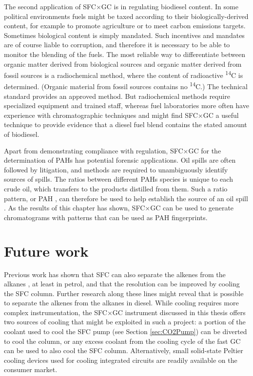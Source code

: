 The second application of SFC×GC is in regulating biodiesel content. In some
political environments fuels might be taxed according to their
biologically-derived content, for example to promote agriculture or to meet
carbon emissions targets. Sometimes biological content is simply mandated. Such
incentives and mandates are of course liable to corruption, and therefore it is
necessary to be able to monitor the blending of the fuels. The most
reliable way to differentiate between organic matter derived from biological
sources and organic matter derived from fossil sources is a radiochemical
method, where the content of radioactive \textsuperscript{14}C is determined.
(Organic material from fossil sources contains no \textsuperscript{14}C.) The
technical standard  provides an approved method. But radiochemical
methods require specialized equipment and trained staff, whereas fuel
laboratories more often have experience with chromatographic techniques and
might find SFC×GC a useful technique to provide evidence that a diesel fuel
blend contains the stated amount of biodiesel.

Apart from demonstrating compliance with regulation, SFC×GC for the
determination of PAHs has potential forensic applications. Oil spills are often
followed by litigation, and methods are required to unambiguously identify
sources of spills. The ratios between different PAHs species is unique to each
crude oil, which transfers to the products distilled from them. Such a ratio
pattern, or PAH , can therefore be used to help establish
the source of an oil spill \autocite{Wang2008}. As the results of this chapter
has shown, SFC×GC can be used to generate chromatograms with patterns that can
be used as PAH fingerprints.

\section{Future work}

Previous work has shown that SFC can also separate the alkenes from the alkanes
\autocite{Venter1999}, at least in petrol, and that the resolution can be
improved by cooling the SFC column. Further research along these lines might
reveal that is possible to separate the alkenes from the alkanes in diesel.
While cooling requires more complex instrumentation, the SFC×GC instrument
discussed in this thesis offers two sources of cooling that might be exploited
in such a project: a portion of the coolant used to cool the SFC pump (see
Section \ref{sec:CO2Pump}) can be diverted to cool the column, or any excess
coolant from the cooling cycle of the fast GC can be used to also cool the SFC
column. Alternatively, small solid-state Peltier cooling devices used for
cooling integrated circuits are readily available on the consumer market.

